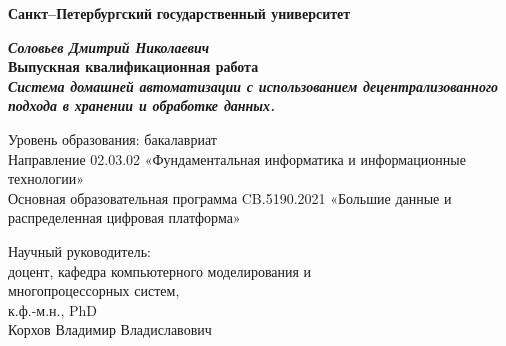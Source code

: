 
\begin{titlepage}
\begin{center}

\textbf{Санкт--Петербургский}
\textbf{государственный университет}

\vspace{35mm}

\textbf{\textit{\large Соловьев Дмитрий Николаевич}} \\[8mm]
\textbf{\large Выпускная квалификационная работа}\\[3mm]
\textbf{\textit{\large Система домашней автоматизации с использованием децентрализованного подхода в хранении и обработке данных.}}

\vspace{20mm}
Уровень образования: бакалавриат\\
Направление 02.03.02  «Фундаментальная информатика и информационные технологии»\\
Основная образовательная программа CB.5190.2021
«Большие данные и распределенная цифровая платформа»\\[25mm]


\begin{flushright}
\fontsize{12}{13}\selectfont
\begin{minipage}[t]{0.65\textwidth}
{Научный руководитель:} \\
доцент, кафедра компьютерного моделирования и \\многопроцессорных систем,\\к.ф.-м.н., PhD\\Корхов Владимир Владиславович


\end{minipage}
\end{flushright}
\end{center}
\end{titlepage}
